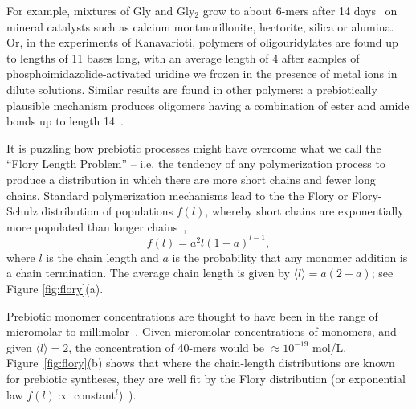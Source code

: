 \documentclass[journal=jacsat,manuscript=article,layout=twocolumn]{achemso}
\begin{document}
For example, mixtures of Gly and Gly$_2$ grow to about 6-mers after 14 
days~\cite{Rode1997,Rode1999} on mineral catalysts such as calcium montmorillonite, hectorite, 
silica or alumina.  Or, in the 
experiments of Kanavarioti, polymers of oligouridylates are found up to lengths of 11 bases long, 
with an average length of 4 \cite{Kanavarioti2001} after samples of phosphoimidazolide-activated 
uridine we frozen in the presence of metal ions in dilute solutions.  Similar results are found in 
other polymers: a prebiotically plausible mechanism produces oligomers having a combination of 
ester and amide bonds up to length 14~\cite{Forsythe2015}.  

It is puzzling how prebiotic processes might have overcome what we call the ``Flory Length 
Problem'' -- i.e. the tendency of any 
polymerization process to produce a distribution in which there are more short chains and fewer 
long chains.  Standard polymerization mechanisms lead to the the Flory or Flory-Schulz distribution 
of populations $f(l)$, whereby short chains are exponentially more populated than longer 
chains~\cite{Flory1953}, 
\begin{equation}
 f(l)=a^2l(1-a)^{l-1},\label{eq:flory}
\end{equation} 
where $l$ is the chain length and $a$ is the probability that any monomer addition is a chain 
termination.  The average chain length is given by $\langle l \rangle = a(2- a)$; see Figure 
\ref{fig:flory}(a).  

 Prebiotic monomer concentrations are thought to have been in the range of micromolar to 
millimolar~\cite{Stribling1987,Huber1998,Aubrey2009,Kanavarioti2001,Lazcano1996}.  Given micromolar 
concentrations of monomers, and given $\langle l \rangle = 2$, the concentration of 40-mers would 
be $\approx 10^{-19} $ mol/L.  Figure~\ref{fig:flory}(b) shows that where the chain-length 
distributions are known for prebiotic syntheses, they are well fit by the Flory 
distribution (or exponential law $f(l)\propto$ 
constant$^l$)~\cite{nowak2008prevolutionary,Derr2012}).
\end{document}
